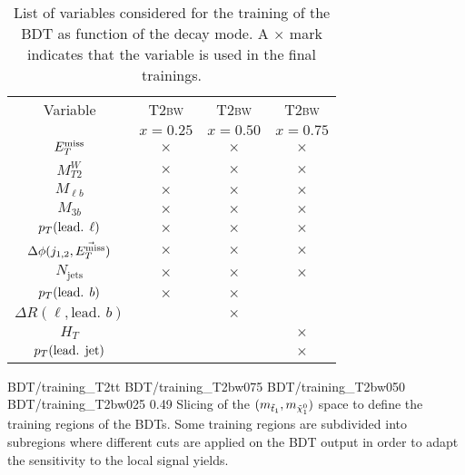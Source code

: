 \begin{table}[h!]
\begin{center}
\begin{tabular}{|c|ccc|}
                \hline
                Variable                            & \textsc{T2bw}  & \textsc{T2bw}  & \textsc{T2bw}      \\
                                                    & $x=0.25$       & $x=0.50$       & $x=0.75$  \\
                \hline
                $E_T^\text{miss}$                              & $\times$       & $\times$       & $\times$  \\
                $M_{T2}^W$                          & $\times$       & $\times$       & $\times$  \\
                $M_{\ell b}$                        & $\times$       & $\times$       & $\times$  \\
                $M_{3 b}$                           & $\times$       & $\times$       & $\times$  \\
                $p_T(\text{lead. } \ell)$           & $\times$       & $\times$       & $\times$  \\
                $\Delta\phi(j_{1,2},\vec{E_T^\text{miss}})$    & $\times$       & $\times$       & $\times$  \\
                $N_\text{jets}$                     & $\times$       & $\times$       & $\times$  \\
                $p_T(\text{lead. } b)$              & $\times$       & $\times$       &           \\
                $\Delta R( \ell, \text{lead. } b)$  &                & $\times$       &           \\
                $H_{T}$                             &                &                & $\times$  \\
                $p_T(\text{lead. jet})$             &                &                & $\times$  \\
                \hline
            \end{tabular}
            \caption{List of variables considered for the training of the BDT
            as function of the decay mode. A $\times$ mark indicates that the variable
            is used in the final trainings.}
            \label{tab:BDTVariableUsage}
        \end{center}
    \end{table}

                      {BDT/training_T2tt}
                      {BDT/training_T2bw075}
                      {BDT/training_T2bw050}
                      {BDT/training_T2bw025}
                      {0.49}
                      {Slicing of the $(m_{\tilde{t}_1},m_{\tilde{\chi}_1^0})$ space
                      to define the training regions of the BDTs. Some training
                      regions are subdivided into subregions where different cuts
                      are applied on the BDT output in order to adapt the sensitivity
                      to the local signal yields.}

